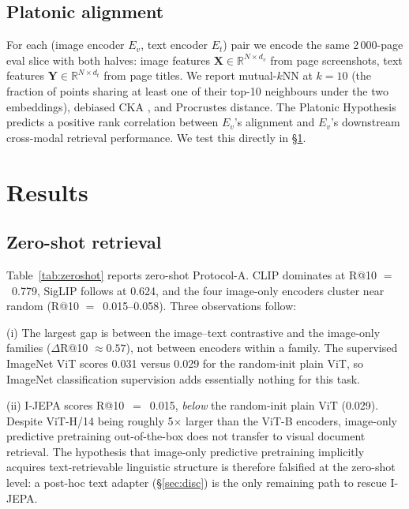 \documentclass{article}
\begin{document}
\subsection{Platonic alignment}
\label{sec:platonic}

For each (image encoder $E_v$, text encoder $E_t$) pair we encode
the same 2\,000-page eval slice with both halves: image features
$\mathbf{X} \in \mathbb{R}^{N\times d_v}$ from page screenshots,
text features $\mathbf{Y}\in\mathbb{R}^{N\times d_t}$ from page
titles. We report mutual-$k$NN at $k=10$ (the fraction of points
sharing at least one of their top-10 neighbours under the two
embeddings), debiased CKA \cite{kornblith2019cka, murphy2024align},
and Procrustes distance. The Platonic Hypothesis predicts a
positive rank correlation between $E_v$'s alignment and $E_v$'s
downstream cross-modal retrieval performance. We test this
directly in \S\ref{sec:results}.

\section{Results}
\label{sec:results}

\subsection{Zero-shot retrieval}

Table~\ref{tab:zeroshot} reports zero-shot Protocol-A. CLIP
dominates at R@10 $=$~0.779, SigLIP follows at 0.624, and the four
image-only encoders cluster near random (R@10 $=$~0.015--0.058).
Three observations follow:

(i) The largest gap is between the image--text contrastive and
the image-only families ($\Delta$R@10 $\approx 0.57$), not between
encoders within a family. The supervised ImageNet ViT scores 0.031
versus 0.029 for the random-init plain ViT, so ImageNet
classification supervision adds essentially nothing for this task.

(ii) I-JEPA scores R@10~$=$~0.015, \emph{below} the random-init
plain ViT (0.029). Despite ViT-H/14 being roughly 5$\times$ larger
than the ViT-B encoders, image-only predictive pretraining
out-of-the-box does not transfer to visual document retrieval.
The hypothesis that image-only predictive pretraining implicitly
acquires text-retrievable linguistic structure is therefore
falsified at the zero-shot level: a post-hoc text adapter
(\S\ref{sec:disc}) is the only remaining path to rescue I-JEPA.
\end{document}
